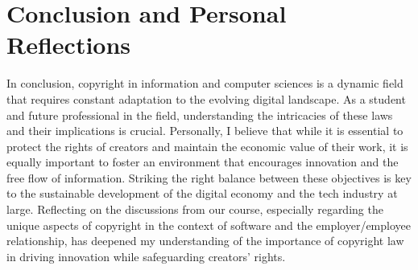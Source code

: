 \documentclass[10pt,a4paper]{article}
\begin{document}
\section*{Conclusion and Personal Reflections}
In conclusion, copyright in information and computer sciences is a dynamic field that requires constant adaptation to the evolving digital landscape. As a student and future professional in the field, understanding the intricacies of these laws and their implications is crucial. Personally, I believe that while it is essential to protect the rights of creators and maintain the economic value of their work, it is equally important to foster an environment that encourages innovation and the free flow of information. Striking the right balance between these objectives is key to the sustainable development of the digital economy and the tech industry at large. Reflecting on the discussions from our course, especially regarding the unique aspects of copyright in the context of software and the employer/employee relationship, has deepened my understanding of the importance of copyright law in driving innovation while safeguarding creators' rights.
\end{document}
